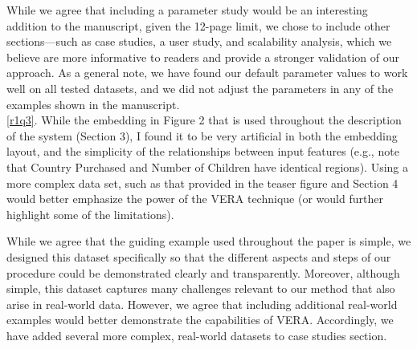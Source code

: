 \documentclass[11pt]{article}
\newcounter{rtaskno}
\newcommand{\rtask}[1]{\refstepcounter{rtaskno}\label{#1}}
\newcommand{\reviewc}[2]{\begin{leftbar}\noindent\rtask{#1}\ref{#1}. #2\end{leftbar}\vspace*{-4mm}}
\newcommand{\answer}[1]{\noindent #1\\[8mm]}
\newlength{\leftbarwidth}
\newlength{\leftbarsep}
\renewenvironment{leftbar}{%
    \def\FrameCommand{{\color{black}{\vrule width \leftbarwidth\relax\hspace {\leftbarsep}}}}%
    \MakeFramed {\advance \hsize -\width \FrameRestore }%
}{\endMakeFramed}
\begin{document}
\answer{While we agree that including a parameter study would be an interesting addition to the manuscript, given the 12-page limit, we chose to include other sections—such as case studies, a user study, and scalability analysis, which we believe are more informative to readers and provide a stronger validation of our approach. As a general note, we have found our default parameter values to work well on all tested datasets, and we did not adjust the parameters in any of the examples shown in the manuscript.}


\reviewc{r1q3}{While the embedding in Figure 2 that is used throughout the description of the system (Section 3), I found it to be very artificial in both the embedding layout, and the simplicity of the relationships between input features (e.g., note that Country Purchased and Number of Children have identical regions).  Using a more complex data set, such as that provided in the teaser figure and Section 4 would better emphasize the power of the VERA technique (or would further highlight some of the limitations).}

\answer{While we agree that the guiding example used throughout the paper is simple, we designed this dataset specifically so that the different aspects and steps of our procedure could be demonstrated clearly and transparently. Moreover, although simple, this dataset captures many challenges relevant to our method that also arise in real-world data. However, we agree that including additional real-world examples would better demonstrate the capabilities of VERA. Accordingly, we have added several more complex, real-world datasets to case studies section.}


\end{document}
